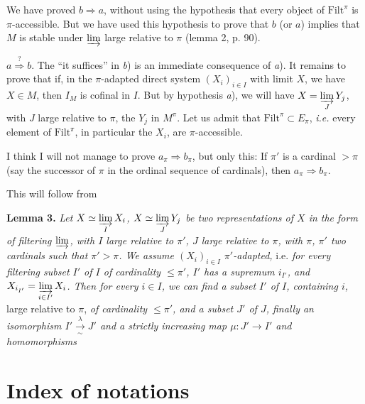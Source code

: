 We have proved $b\Longrightarrow a$, without using the hypothesis that every object of $\mathrm{Filt}^\pi$ is $\pi$-accessible. But we have used this hypothesis to prove that $b$ (or $a$) implies that $M$ is stable under $\varinjlim$ large relative to $\pi$ (lemma 2, p. 90).

$a\overset{?}{\Longrightarrow} b$. The ``it suffices'' in \textit{b}) is an immediate consequence of \textit{a}). It remains to prove that if, in the $\pi$-adapted direct system $(X_i)_{i\in I}$ with limit $X$, we have $X\in M$, then $I_M$ is cofinal in $I$. But by hypothesis \textit{a}), we will have $X = \varinjlim\limits_J Y_j$, with $J$ large relative to $\pi$, the $Y_j$ in $M^\pi$. Let us admit that $\mathrm{Filt}^\pi\subset E_\pi$, \textit{i.e.} every element of $\mathrm{Filt}^\pi$, in particular the $X_i$, are $\pi$-accessible.

I think I will not manage to prove $a_\pi\Longrightarrow b_\pi$, but only this: If $\pi'$ is a cardinal $>\pi$ (say the successor of $\pi$ in the ordinal sequence of cardinals), then $a_\pi\Longrightarrow b_\pi$.

This will follow from

\textbf{Lemma 3.} \textit{Let $X\simeq\varinjlim\limits_I X_i$, $X\simeq\varinjlim\limits_J Y_j$ be two representations of $X$ in the form of filtering $\varinjlim$, with $I$ large relative to $\pi'$, $J$ large relative to $\pi$, with $\pi$, $\pi'$ two cardinals such that $\pi'>\pi$. We assume $(X_i)_{i\in I}$ $\pi'$-adapted,} i.e. \textit{for every filtering subset $I'$ of $I$ of cardinality $\le\pi'$, $I'$ has a supremum $i_{I'}$, and $X_{i_{I'}} = \varinjlim\limits_{i\in I'} X_i$. Then for every $i\in I$, we can find a subset $I'$ of $I$, containing $i$,} large relative to $\pi$, \textit{of cardinality $\le\pi'$, and a subset $J'$ of $J$, finally an isomorphism $I'\xrightarrow[\sim]{\lambda}J'$ and a strictly increasing map $\mu : J'\longrightarrow I'$ and homomorphisms} 

\newpage
{}

\section*{Index of notations}

